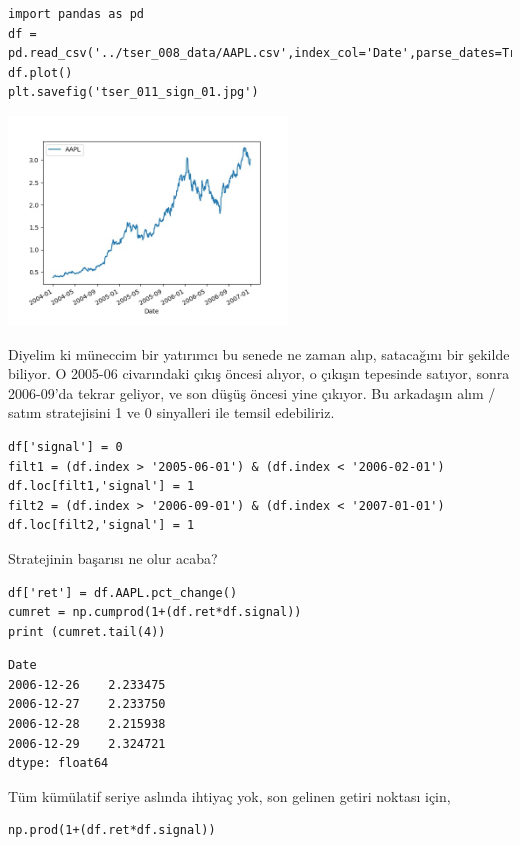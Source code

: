 \documentclass[12pt,fleqn]{article}\usepackage{../../common}
\begin{document}
\begin{verbatim}
import pandas as pd
df = pd.read_csv('../tser_008_data/AAPL.csv',index_col='Date',parse_dates=True)
df.plot()
plt.savefig('tser_011_sign_01.jpg')
\end{verbatim}

\includegraphics[width=20em]{tser_011_sign_01.jpg}

Diyelim ki müneccim bir yatırımcı bu senede ne zaman alıp, satacağını bir
şekilde biliyor. O 2005-06 civarındaki çıkış öncesi alıyor, o çıkışın tepesinde
satıyor, sonra 2006-09'da tekrar geliyor, ve son düşüş öncesi yine çıkıyor.  Bu
arkadaşın alım / satım stratejisini 1 ve 0 sinyalleri ile temsil edebiliriz.

\begin{verbatim}
df['signal'] = 0
filt1 = (df.index > '2005-06-01') & (df.index < '2006-02-01')
df.loc[filt1,'signal'] = 1
filt2 = (df.index > '2006-09-01') & (df.index < '2007-01-01')
df.loc[filt2,'signal'] = 1
\end{verbatim}

Stratejinin başarısı ne olur acaba?

\begin{verbatim}
df['ret'] = df.AAPL.pct_change()
cumret = np.cumprod(1+(df.ret*df.signal))
print (cumret.tail(4))
\end{verbatim}

\begin{verbatim}
Date
2006-12-26    2.233475
2006-12-27    2.233750
2006-12-28    2.215938
2006-12-29    2.324721
dtype: float64
\end{verbatim}

Tüm kümülatif seriye aslında ihtiyaç yok, son gelinen getiri noktası için,

\begin{verbatim}
np.prod(1+(df.ret*df.signal))
\end{verbatim}
\end{document}
